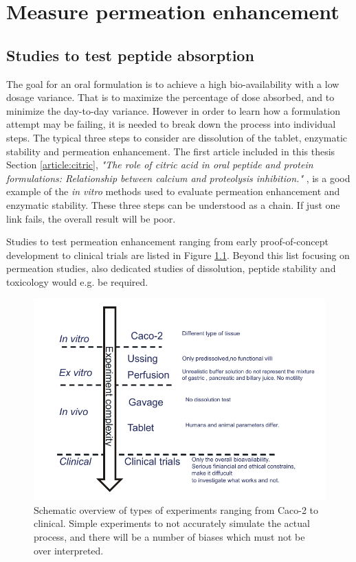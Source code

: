 \chapter{Measure permeation enhancement}

\section{Studies to test peptide absorption}
The goal for an oral formulation is to achieve a high bio-availability with a low dosage variance. That is to maximize the percentage of dose absorbed, and to minimize the day-to-day variance. However in order to learn how a formulation attempt may be failing, it is needed to break down the process into individual steps. The typical three steps to consider are dissolution of the tablet, enzymatic stability and permeation enhancement. The first article included in this thesis Section \ref{article:citric}, \textit{"The role of citric acid in oral peptide and protein formulations: Relationship between calcium and proteolysis inhibition."} \cite{welling2014citric}, is a good example of the \textit{in vitro} methods used to evaluate permeation enhancement and enzymatic stability. These three steps can be understood as a chain. If just one link fails, the overall result will be poor.

Studies to test permeation enhancement ranging from early proof-of-concept development to clinical trials are listed in Figure \ref{devel_typeOf}. Beyond this list focusing on permeation studies, also dedicated studies of dissolution, peptide stability and toxicology would e.g. be required.

\begin{figure}[!htbp]
\includegraphics{graphics/typeOfExperiments.pdf}
\caption{Schematic overview of types of experiments ranging from Caco-2 to clinical. Simple experiments to not accurately simulate the actual process, and there will be a number of biases which must not be over interpreted.}
\label{devel_typeOf}
\end{figure}

